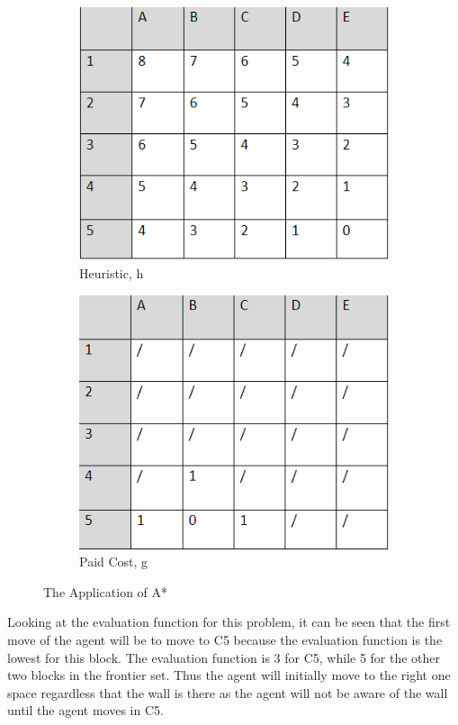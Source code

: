 \documentclass[paper=a4, fontsize=11pt]{scrartcl} %
\begin{document}
\begin{figure}[h]
\begin{subfigure}[b]{0.4\linewidth}
	\includegraphics[width=\linewidth]{tablee3}
	\caption{Heuristic, h}
	\end{subfigure}
	\begin{subfigure}[b]{0.4\linewidth}
	\centering
	\includegraphics[width=\linewidth]{table4}
	\caption{Paid Cost, g}
	\end{subfigure}
	\caption{The Application of A*}
\end{figure}


Looking at the evaluation function for this problem, it can be seen that the first move of the agent will be to move to C5 because the evaluation function is the lowest for this block. The evaluation function is 3 for C5, while 5 for the other two blocks in the frontier set. Thus the agent will initially move to the right one space regardless that the wall is there as the agent will not be aware of the wall until the agent moves in C5.
\end{document}
